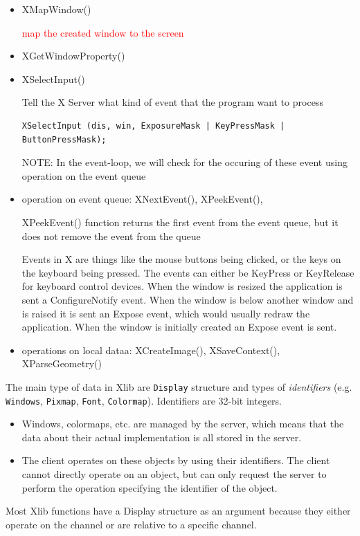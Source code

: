 \begin{itemize}
  \item XMapWindow()
  
\textcolor{red}{map the created window to the screen}

  \item XGetWindowProperty()
  
  \item XSelectInput()
  
Tell the X Server what kind of event that the program want to process
\begin{verbatim}
XSelectInput (dis, win, ExposureMask | KeyPressMask | ButtonPressMask);
\end{verbatim} 
NOTE: In the event-loop, we will check for the occuring of these event using
operation on the event queue

  \item operation on event queue: XNextEvent(), XPeekEvent(), 
  
XPeekEvent() function returns the first event from the event queue, but
it does not remove the event from the queue
  
Events in X are things like the mouse buttons being clicked, or the keys on the
keyboard being pressed. The events can either be KeyPress or KeyRelease for
keyboard control devices.
 When the window is resized the application is sent a ConfigureNotify event.
When the window is below another window and is raised it is sent an Expose
event, which would usually redraw the application. When the window is initially
created an Expose event is sent.


  \item operations on local dataa: XCreateImage(), XSaveContext(),
  XParseGeometry()
\end{itemize}
  
The main type of data in Xlib are \verb!Display! structure and types of
{\it identifiers} (e.g. \verb!Windows!, \verb!Pixmap!, \verb!Font!,
\verb!Colormap!). Identifiers are 32-bit integers.
\begin{itemize}
  \item Windows, colormaps, etc. are managed by the server, which means that the
  data about their actual implementation is all stored in the server. 
  
  \item The client operates on these objects by using their identifiers. The
  client cannot directly operate on an object, but can only request the server
  to perform the operation specifying the identifier of the object.
\end{itemize}
Most Xlib functions have a Display structure as an argument because they either
operate on the channel or are relative to a specific channel. 

